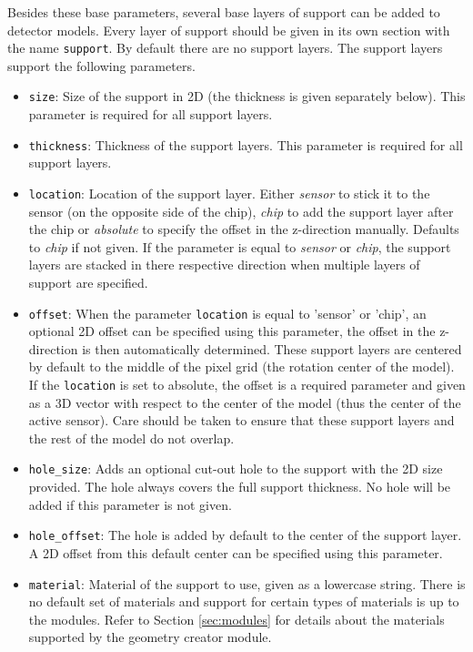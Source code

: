 Besides these base parameters, several base layers of support can be added to detector models. Every layer of support should be given in its own section with the name \texttt{support}. By default there are no support layers. The support layers support the following parameters.
\begin{itemize}
\item \texttt{size}: Size of the support in 2D (the thickness is given separately below). This parameter is required for all support layers.
\item \texttt{thickness}: Thickness of the support layers. This parameter is required for all support layers.
\item \texttt{location}: Location of the support layer. Either \textit{sensor} to stick it to the sensor (on the opposite side of the chip), \textit{chip} to add the support layer after the chip or \textit{absolute} to specify the offset in the z-direction manually. Defaults to \textit{chip} if not given. If the parameter is equal to \textit{sensor} or \textit{chip}, the support layers are stacked in there respective direction when multiple layers of support are specified.
\item \texttt{offset}: When the parameter \texttt{location} is equal to 'sensor' or 'chip', an optional 2D offset can be specified using this parameter, the offset in the z-direction is then automatically determined. These support layers are centered by default to the middle of the pixel grid (the rotation center of the model). If the \texttt{location} is set to absolute, the offset is a required parameter and given as a 3D vector with respect to the center of the model (thus the center of the active sensor). Care should be taken to ensure that these support layers and the rest of the model do not overlap.
\item \texttt{hole\_size}: Adds an optional cut-out hole to the support with the 2D size provided. The hole always covers the full support thickness. No hole will be added if this parameter is not given.
\item \texttt{hole\_offset}: The hole is added by default to the center of the support layer. A 2D offset from this default center can be specified using this parameter.
\item \texttt{material}: Material of the support to use, given as a lowercase string. There is no default set of materials and support for certain types of materials is up to the modules. Refer to Section \ref{sec:modules} for details about the materials supported by the geometry creator module. 
\end{itemize}

